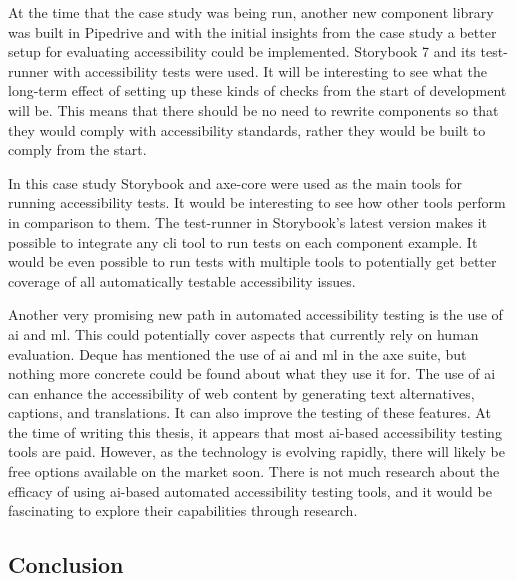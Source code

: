 \documentclass{master_thesis}
\begin{document}
At the time that the case study was being run, another new component library was built in Pipedrive and with the initial insights from the case study a better setup for evaluating accessibility could be implemented. Storybook 7 and its test-runner with accessibility tests were used. It will be interesting to see what the long-term effect of setting up these kinds of checks from the start of development will be. This means that there should be no need to rewrite components so that they would comply with accessibility standards, rather they would be built to comply from the start.

In this case study Storybook and axe-core were used as the main tools for running accessibility tests. It would be interesting to see how other tools perform in comparison to them. The test-runner in Storybook's latest version makes it possible to integrate any \ac{cli} tool to run tests on each component example. It would be even possible to run tests with multiple tools to potentially get better coverage of all automatically testable accessibility issues.

Another very promising new path in automated accessibility testing is the use of \ac{ai} and \ac{ml}. This could potentially cover aspects that currently rely on human evaluation. Deque has mentioned the use of \ac{ai} and \ac{ml} in the axe suite, but nothing more concrete could be found about what they use it for. The use of \ac{ai} can enhance the accessibility of web content by generating text alternatives, captions, and translations. It can also improve the testing of these features. At the time of writing this thesis, it appears that most \ac{ai}-based accessibility testing tools are paid. However, as the technology is evolving rapidly, there will likely be free options available on the market soon. There is not much research about the efficacy of using \ac{ai}-based automated accessibility testing tools, and it would be fascinating to explore their capabilities through research.

\subsection{Conclusion}
\end{document}
